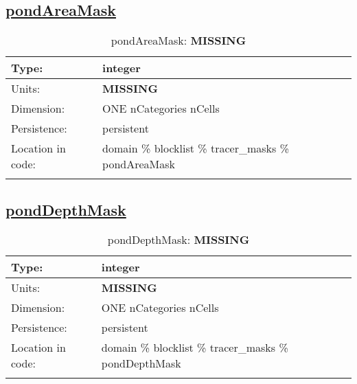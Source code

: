 \subsection[pondAreaMask]{\hyperref[sec:var_tab_tracer_masks]{pondAreaMask}}
\label{subsec:var_sec_tracer_masks_pondAreaMask}
\begin{center}
\begin{longtable}{| p{2.0in} | p{4.0in} |}
        \hline 
        Type: & integer \\
        \hline 
        Units: & {\bf \color{red} MISSING} \\
        \hline 
        Dimension: & ONE nCategories nCells \\
        \hline 
        Persistence: & persistent \\
        \hline 
         Location in code: & domain \% blocklist \% tracer\_masks \% pondAreaMask \\
         \hline 
    \caption{pondAreaMask: {\bf \color{red} MISSING}}
\end{longtable}
\end{center}
\subsection[pondDepthMask]{\hyperref[sec:var_tab_tracer_masks]{pondDepthMask}}
\label{subsec:var_sec_tracer_masks_pondDepthMask}
\begin{center}
\begin{longtable}{| p{2.0in} | p{4.0in} |}
        \hline 
        Type: & integer \\
        \hline 
        Units: & {\bf \color{red} MISSING} \\
        \hline 
        Dimension: & ONE nCategories nCells \\
        \hline 
        Persistence: & persistent \\
        \hline 
         Location in code: & domain \% blocklist \% tracer\_masks \% pondDepthMask \\
         \hline 
    \caption{pondDepthMask: {\bf \color{red} MISSING}}
\end{longtable}
\end{center}
